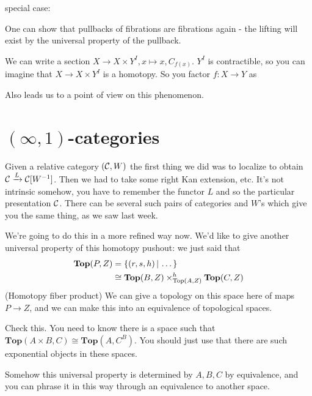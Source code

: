 \documentclass[../MH_Total.tex]{subfiles}
\begin{document}
special case:
\begin{center}
\end{center}
One can show that pullbacks of fibrations are fibrations again - the lifting will exist by the universal property of the pullback. 

We can write a section $X \to X \times Y^I, x \mapsto x,C_{f(x)}$. $Y^I$ is contractible, so you can imagine that $X \to X \times Y^I$ is a homotopy. So you factor $f: X \to Y$ as
\begin{center}
\end{center}
Also leads us to a point of view on this phenomenon.

\section{$(\infty, 1)$-categories}
Given a relative category $(\mathcal{C},W)$ the first thing we did was to localize to obtain $\mathcal{C} \xrightarrow{L} \mathcal{C}[W^{-1}]$. Then we had to take some right Kan extension, etc. It's not intrinsic somehow, you have to remember the functor $L$ and so the particular presentation $\mathcal{C}$. There can be several such pairs of categories and $W$'s which give you the same thing, as we saw last week. 

We're going to do this in a more refined way now. We'd like to give another universal property of this homotopy pushout: we just said that 
\begin{align*}
\mathbf{Top}(P,Z) &= \{(r,s,h)\,|\,\dots\}\\
&\cong \mathbf{Top}(B,Z) \times^h_{\operatorname{Top}(A,Z)} \mathbf{Top}(C,Z)
\end{align*}
(Homotopy fiber product) We can give a topology on this space here of maps $P \to Z$, and we can make this into an equivalence of topological spaces.

\begin{exercise}
 	Check this. You need to know there is a space such that $\mathbf{Top}(A \times B,C) \cong \mathbf{Top}(A,C^B)$. You should just use that there are such exponential objects in these spaces.
 \end{exercise} 
Somehow this universal property is determined by $A,B,C$ by equivalence, and you can phrase it in this way through an equivalence to another space. 
\end{document}
